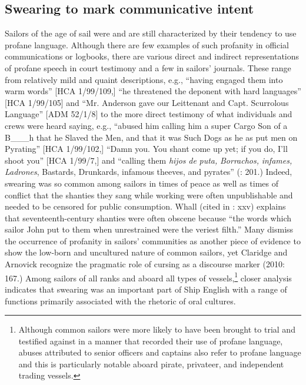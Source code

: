 \subsection{\textbf{Swearing} \textbf{to} \textbf{mark} \textbf{communicative} \textbf{intent}}%

  Sailors of the age of sail were and are still characterized by their tendency to use profane language. Although there are few examples of such profanity in official communications or logbooks, there are various direct and indirect representations of profane speech in court testimony and a few in sailors’ journals. These range from relatively mild and quaint descriptions, e.g., “having engaged them into warm words” [HCA 1/99/109,] “he threatened the deponent with hard languages” [HCA 1/99/105] and “Mr. Anderson gave our Leittenant and Capt. Scurrolous Language” [ADM 52/1/8] to the more direct testimony of what individuals and crews were heard saying, e.g., “abused him calling him a super Cargo Son of a B\_\_\_h that he Slaved the Men, and that it was Such Dogs as he as put men on Pyrating” [HCA 1/99/102,] “Damn you. You shant come up yet; if you do, I’ll shoot you” [HCA 1/99/7,] and “calling them \textit{hijos} \textit{de} \textit{puta,} \textit{Borrachos,} \textit{infames,} \textit{Ladrones}, Bastards, Drunkards, infamous theeves, and pyrates” (\citealt{Gage1648}: 201.) Indeed, swearing was so common among sailors in times of peace as well as times of conflict that the shanties they sang while working were often unpublishable and needed to be censored for public consumption. Whall (cited in \citealt{Palmer1986}: xxv) explains that seventeenth-century shanties were often obscene because “the words which sailor John put to them when unrestrained were the veriest filth.” Many dismiss the occurrence of profanity in sailors’ communities as another piece of evidence to show the low-born and uncultured nature of common sailors, yet Claridge and Arnovick recognize the pragmatic role of cursing as a discourse marker (2010: 167.) Among sailors of all ranks and aboard all types of vessels,\footnote{Although common sailors were more likely to have been brought to trial and testified against in a manner that recorded their use of profane language, abuses attributed to senior officers and captains also refer to profane language and this is particularly notable aboard pirate, privateer, and independent trading vessels.} closer analysis indicates that swearing was an important part of Ship English with a range of functions primarily associated with the rhetoric of oral cultures.


